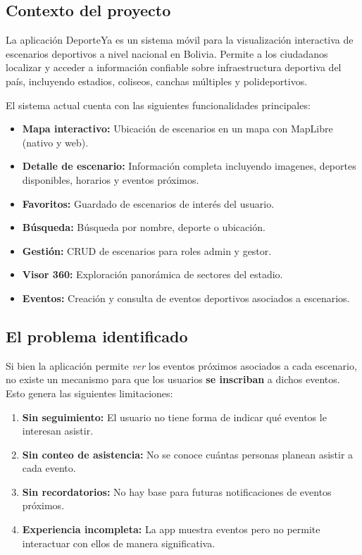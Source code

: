 \documentclass[12pt,letterpaper]{article}
\newcommand{\nombreApp}{DeporteYa}
\begin{document}
\subsection{Contexto del proyecto}

La aplicaci\'on \nombreApp{} es un sistema m\'ovil para la
visualizaci\'on interactiva de escenarios deportivos a nivel nacional
en Bolivia. Permite a los ciudadanos localizar y acceder a informaci\'on
confiable sobre infraestructura deportiva del pa\'is, incluyendo
estadios, coliseos, canchas m\'ultiples y polideportivos.

El sistema actual cuenta con las siguientes funcionalidades principales:

\begin{itemize}
  \item \textbf{Mapa interactivo:} Ubicaci\'on de escenarios en un mapa
    con MapLibre (nativo y web).
  \item \textbf{Detalle de escenario:} Informaci\'on completa incluyendo
    imagenes, deportes disponibles, horarios y eventos pr\'oximos.
  \item \textbf{Favoritos:} Guardado de escenarios de inter\'es del
    usuario.
  \item \textbf{B\'usqueda:} B\'usqueda por nombre, deporte o
    ubicaci\'on.
  \item \textbf{Gesti\'on:} CRUD de escenarios para roles admin y gestor.
  \item \textbf{Visor 360:} Exploraci\'on panor\'amica de sectores del
    estadio.
  \item \textbf{Eventos:} Creaci\'on y consulta de eventos deportivos
    asociados a escenarios.
\end{itemize}

\subsection{El problema identificado}

Si bien la aplicaci\'on permite \textit{ver} los eventos pr\'oximos
asociados a cada escenario, no existe un mecanismo para que los
usuarios \textbf{se inscriban} a dichos eventos. Esto genera las
siguientes limitaciones:

\begin{enumerate}
  \item \textbf{Sin seguimiento:} El usuario no tiene forma de indicar
    qu\'e eventos le interesan asistir.
  \item \textbf{Sin conteo de asistencia:} No se conoce cu\'antas
    personas planean asistir a cada evento.
  \item \textbf{Sin recordatorios:} No hay base para futuras
    notificaciones de eventos pr\'oximos.
  \item \textbf{Experiencia incompleta:} La app muestra eventos pero
    no permite interactuar con ellos de manera significativa.
\end{enumerate}
\end{document}
